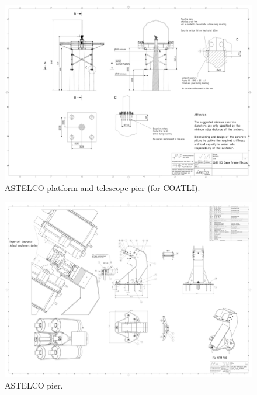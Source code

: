\begin{figure}
\begin{center}
\includegraphics[height=0.95\linewidth,angle=90]{figures/buildings-ddoti-astelco-enclosure-drawing-6610}
\end{center}
\caption{{\projectname} ASTELCO platform and telescope pier (for COATLI).}
\label{figure:buildings-drawing-astelco}
\end{figure}

\begin{figure}
\begin{center}
\includegraphics[height=0.95\linewidth,angle=90]{figures/buildings-ddoti-astelco-pier-drawing-3234}
\end{center}
\caption{{\projectname} ASTELCO pier.}
\label{figure:buildings-drawing-astelco-pier}
\end{figure}

